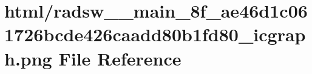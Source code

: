 \hypertarget{radsw____main__8f__ae46d1c061726bcde426caadd80b1fd80__icgraph_8png}{}\section{html/radsw\+\_\+\+\_\+main\+\_\+8f\+\_\+ae46d1c061726bcde426caadd80b1fd80\+\_\+icgraph.png File Reference}
\label{radsw____main__8f__ae46d1c061726bcde426caadd80b1fd80__icgraph_8png}
